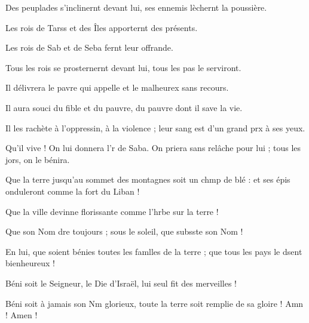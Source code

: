\item Des peuplades s’inclinernt devant lui,\psstar{} ses ennemis lèchernt la poussière.
\item Les rois de Tarss et des Îles\psstar{} apporternt des présents.
\item Les rois de Sab et de Seba\psstar{} fernt leur offrande.
\item Tous les rois se prosternernt devant lui,\psstar{} tous les pas le serviront.
\item Il délivrera le pavre qui appelle\psstar{} et le malheurex sans recours.
\item Il aura souci du fible et du pauvre,\psstar{} du pauvre dont il save la vie.
\item Il les rachète à l’oppressin, à la violence ;\psstar{} leur sang est d’un grand prx à ses yeux.
\item Qu’il vive ! On lui donnera l’r de Saba.\psstar{} On priera sans relâche pour lui ; tous les jors, on le bénira.
\item Que la terre jusqu’au sommet des montagnes soit un chmp de blé :\psstar{} et ses épis onduleront comme la fort du Liban ! 
\item Que la ville devinne florissante\psstar{} comme l’hrbe sur la terre !
\item Que son Nom dre toujours ;\psstar{} sous le soleil, que subsste son Nom !
\item En lui, que soient bénies toutes les famlles de la terre ;\psstar{} que tous les pays le dsent bienheureux !
\item Béni soit le Seigneur, le Die d’Israël,\psstar{} lui seul fit des merveilles !
\item Béni soit à jamais son Nm glorieux,\psstar{} toute la terre soit remplie de sa gloire ! Amn ! Amen !